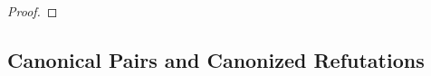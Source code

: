 \documentclass[11pt,a4paper]{article}
\newcommand{\treewidthvalue}{k}
\newcommand{\forgetvertextype}[1]{\mathtt{ForgetVertex}\{#1\}}
\newcommand{\vertexone}{u}
\newcommand{\vertextwo}{v}
\newcommand{\dpcore}{\mathsf{D}}
\newcommand{\witnessset}{S}
\newcommand{\relabelingfunction}{f}
\newcommand{\action}{\rho}
\begin{document}
\begin{proof}
\end{proof}

\subsection{Canonical Pairs and Canonized Refutations}
\label{subsection:CanonicalRefutation}
\end{document}

